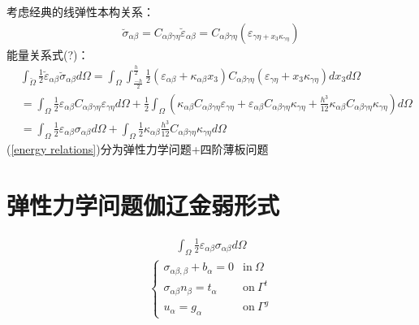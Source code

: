 \documentclass[engineeringmaster]{hquThesis}
\begin{document}
考虑经典的线弹性本构关系：
\begin{equation}
\begin{split}
    \breve{\sigma}_{\alpha\beta}=C_{\alpha\beta\gamma\eta}\breve{\varepsilon}_{\alpha\beta}=C_{\alpha\beta\gamma\eta}(\varepsilon_{\gamma\eta+x_3\kappa_{\gamma\eta}})
\end{split}
\end{equation}
能量关系式(?)：
\begin{equation}\label{energy relations}
\begin{split}
&\int_{\breve{\Omega}}\frac{1}{2}\breve{\varepsilon}_{\alpha\beta}\breve{\sigma}_{\alpha\beta}d\Omega=\int_{\Omega}\int_{\frac{-h}{2}}^{\frac{h}{2}}\frac{1}{2}(\varepsilon_{\alpha\beta}+\kappa_{\alpha\beta}x_3)C_{\alpha\beta\gamma\eta}(\varepsilon_{\gamma\eta}+x_3\kappa_{\gamma\eta})dx_3d\Omega\\
&=\int_{\Omega}\frac{1}{2}\varepsilon_{\alpha\beta}C_{\alpha\beta\gamma\eta}\varepsilon_{\gamma\eta}d\Omega+\frac{1}{2}\int_{\Omega}(\kappa_{\alpha\beta}C_{\alpha\beta\gamma\eta}\varepsilon_{\gamma\eta}+\varepsilon_{\alpha\beta}C_{\alpha\beta\gamma\eta}\kappa_{\gamma\eta}+\frac{h^3}{12}\kappa_{\alpha\beta}C_{\alpha\beta\gamma\eta}\kappa_{\gamma\eta})d\Omega\\
&=\int_{\Omega}\frac{1}{2}\varepsilon_{\alpha\beta}\sigma_{\alpha\beta}d\Omega+\int_{\Omega}\frac{1}{2}\kappa_{\alpha\beta}\frac{h^3}{12}C_{\alpha\beta\gamma\eta}\kappa_{\gamma\eta}d\Omega
\end{split}
\end{equation}
(\ref{energy relations})分为弹性力学问题+四阶薄板问题
\section{弹性力学问题伽辽金弱形式}
\begin{equation}
\begin{split}
\int_{\Omega}\frac{1}{2}\varepsilon_{\alpha\beta}\sigma_{\alpha\beta}d\Omega
\end{split}
\end{equation}
\begin{equation}
\begin{split}
\begin{cases}
    \sigma_{\alpha\beta,\beta}+b_{\alpha}=0&\text{in}~\Omega\\
    \sigma_{\alpha\beta}n_{\beta}=t_{\alpha}&\text{on}~\Gamma^t\\
    u_{\alpha}=g_{\alpha}&\text{on}~\Gamma^g
\end{cases}
\end{split}
\end{equation}
\end{document}
